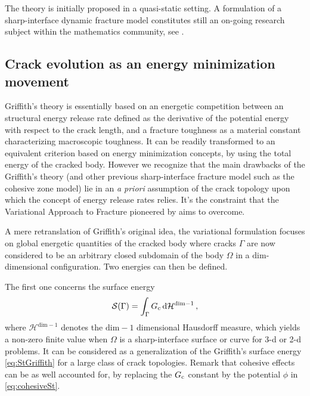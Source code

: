 The theory is initially proposed in a quasi-static setting. A formulation of a sharp-interface dynamic fracture model constitutes still an on-going research subject within the mathematics community, see \cite{Larsen:2010}.

\subsection{Crack evolution as an energy minimization movement}
Griffith's theory is essentially based on an energetic competition between an structural energy release rate defined as the derivative of the potential energy with respect to the crack length, and a fracture toughness as a material constant characterizing macroscopic toughness. It can be readily transformed to an equivalent criterion based on energy minimization concepts, by using the total energy of the cracked body. However we recognize that the main drawbacks of the Griffith's theory (and other previous sharp-interface fracture model such as the cohesive zone model) lie in an \emph{a priori} assumption of the crack topology upon which the concept of energy release rates relies. It's the constraint that the Variational Approach to Fracture pioneered by \cite{FrancfortMarigo:1998} aims to overcome.

A mere retranslation of Griffith's original idea, the variational formulation focuses on global energetic quantities of the cracked body where cracks $\Gamma$ are now considered to be an arbitrary closed subdomain of the body $\Omega$ in a $\mathrm{dim}$-dimensional configuration. Two energies can then be defined.

The first one concerns the surface energy
\begin{equation} \label{eq:SGamma}
\mathcal{S}(\Gamma)=\int_\Gamma G_\mathrm{c}\,\mathrm{d}\mathcal{H}^{\mathrm{dim}-1}\,,
\end{equation}
where $\mathcal{H}^{\mathrm{dim}-1}$ denotes the $\mathrm{dim}-1$ dimensional Hausdorff measure, which yields a non-zero finite value when $\Omega$ is a sharp-interface surface or curve for 3-d or 2-d problems. It can be considered as a generalization of the Griffith's surface energy \eqref{eq:StGriffith} for a large class of crack topologies. Remark that cohesive effects can be as well accounted for, by replacing the $G_\mathrm{c}$ constant by the potential $\phi$ in \eqref{eq:cohesiveSt}.

